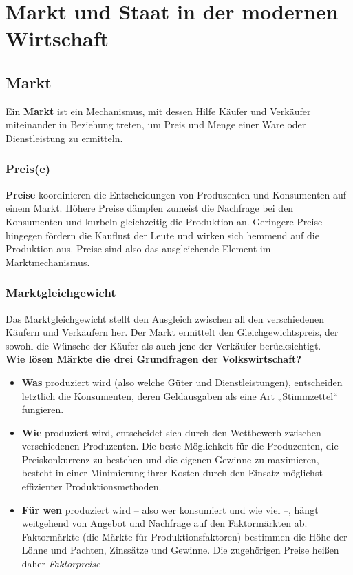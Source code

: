 \documentclass[10pt]{scrartcl}
\begin{document}
 
\section{Markt und Staat in der modernen Wirtschaft}
\subsection{Markt}
Ein {\bf Markt} ist ein Mechanismus, mit dessen Hilfe Käufer und Verkäufer miteinander in Beziehung treten, um Preis und Menge einer Ware oder Dienstleistung zu ermitteln.
\subsubsection{Preis(e)}
{\bf Preise} koordinieren die Entscheidungen von Produzenten und Konsumenten auf einem Markt. Höhere Preise dämpfen zumeist die Nachfrage bei den Konsumenten und kurbeln gleichzeitig die Produktion an. Geringere Preise hingegen fördern die Kauflust der Leute und wirken sich hemmend auf die Produktion aus. Preise sind also das ausgleichende Element im Marktmechanismus.
\subsubsection{Marktgleichgewicht}
Das Marktgleichgewicht stellt den Ausgleich zwischen all den verschiedenen Käufern und Verkäufern her. Der Markt ermittelt den Gleichgewichtspreis, der sowohl die Wünsche der Käufer als auch jene der Verkäufer berücksichtigt.\\
{\bf Wie lösen Märkte die drei Grundfragen der Volkswirtschaft?}
\begin{itemize}
\item {\bf Was} produziert wird (also welche Güter und Dienstleistungen), entscheiden letztlich die Konsumenten, deren Geldausgaben als eine Art „Stimmzettel“ fungieren.
\item {\bf Wie} produziert wird, entscheidet sich durch den Wettbewerb zwischen verschiedenen Produzenten. Die beste Möglichkeit für die Produzenten, die Preiskonkurrenz zu bestehen und die eigenen Gewinne zu maximieren, besteht in einer Minimierung ihrer Kosten durch den Einsatz möglichst effizienter Produktionsmethoden.
\item {\bf Für wen } produziert wird – also wer konsumiert und wie viel –, hängt weitgehend von Angebot und Nachfrage auf den Faktormärkten ab. Faktormärkte (die Märkte für Produktionsfaktoren) bestimmen die Höhe der Löhne und Pachten, Zinssätze und Gewinne. Die zugehörigen Preise heißen daher {\it Faktorpreise}
\end{itemize}
\end{document}
